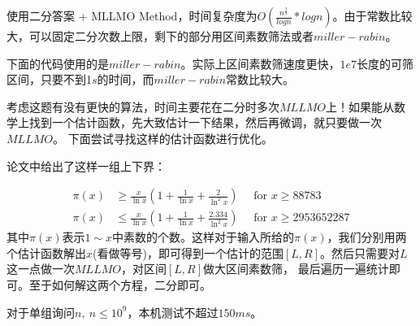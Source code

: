 \begin{solution}
	使用二分答案 + MLLMO Method，时间复杂度为$O(\frac {n^{\frac 3 4}}{ log n} * log n)$。由于常数比较大，可以固定二分次数上限，剩下的部分用区间素数筛法或者$miller-rabin$。
	
	下面的代码使用的是$miller-rabin$。{\heiti 实际上区间素数筛速度更快，$1e7$长度的可筛区间，只要不到1$s$的时间，而$miller-rabin$常数比较大。}
\end{solution}



\begin{note}
考虑这题有没有更快的算法，时间主要花在二分时多次$MLLMO$上！如果能从数学上找到一个估计函数，先大致估计一下结果，然后再微调，就只要做一次$MLLMO$。
下面尝试寻找这样的估计函数进行优化。
\end{note}

\vbox{}

论文\cite{1002.0442}中给出了这样一组上下界：

$$
\begin{aligned} \pi(x) & \geqslant \frac{x}{\ln x}\left(1+\frac{1}{\ln x}+\frac{2}{\ln ^{2} x}\right) \quad \text { for } x \geqslant 88783 \\ \pi(x) & \leqslant \frac{x}{\ln x}\left(1+\frac{1}{\ln x}+\frac{2.334}{\ln ^{2} x}\right) \quad \text { for } x \geqslant 2953652287 \end{aligned}
$$
其中$\pi(x)$表示$1\sim x$中素数的个数。这样对于输入所给的$\pi(x)$，我们分别用两个估计函数解出$x$(看做等号)，即可得到一个估计的范围$[L,R]$。然后只需要对$L$这一点做一次$MLLMO$，对区间$[L,R]$做大区间素数筛，
最后遍历一遍统计即可。至于如何解这两个方程，二分即可。

对于单组询问$n,\ n\le 10^9$，本机测试不超过$150ms$。





\vbox{}






